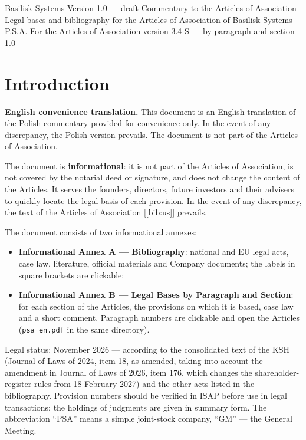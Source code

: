 \documentclass[11pt,a4paper]{report}
\newcommand{\Zr}[1]{[\ref{bib:#1}]}
\begin{document}

\BusinessPlanTitlePage
  {Basilisk Systems}
  {Version 1.0 --- draft}
  {Commentary to the Articles of Association}
  {Legal bases and bibliography for the Articles of Association of Basilisk Systems P.S.A.}
  {For the Articles of Association version 3.4-S --- by paragraph and section}
  {1.0}

\tableofcontents
\newpage

\chapter*{Introduction}

\textbf{English convenience translation.} This document is an English translation of the Polish commentary provided for convenience only. In the event of any discrepancy, the Polish version prevails. The document is not part of the Articles of Association.

The document is \textbf{informational}: it is not part of the Articles of Association, is not covered by the notarial deed or signature, and does not change the content of the Articles. It serves the founders, directors, future investors and their advisers to quickly locate the legal basis of each provision. In the event of any discrepancy, the text of the Articles of Association \Zr{us} prevails.

The document consists of two informational annexes:
\begin{itemize}
  \item \textbf{Informational Annex A --- Bibliography}: national and EU legal acts, case law, literature, official materials and Company documents; the labels in square brackets are clickable;
  \item \textbf{Informational Annex B --- Legal Bases by Paragraph and Section}: for each section of the Articles, the provisions on which it is based, case law and a short comment. Paragraph numbers are clickable and open the Articles (\texttt{psa\_en.pdf} in the same directory).
\end{itemize}

Legal status: November 2026 --- according to the consolidated text of the KSH (Journal of Laws of 2024, item 18, as amended, taking into account the amendment in Journal of Laws of 2026, item 176, which changes the shareholder-register rules from 18 February 2027) and the other acts listed in the bibliography. Provision numbers should be verified in ISAP before use in legal transactions; the holdings of judgments are given in summary form. The abbreviation ``PSA'' means a simple joint-stock company, ``GM'' --- the General Meeting.
\end{document}

